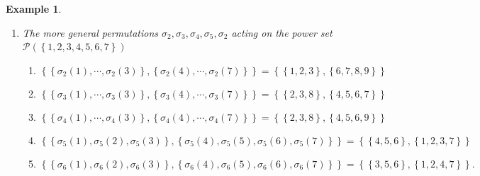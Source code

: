 \documentclass[aps,preprint]{revtex4}%
\newtheorem{example}[theorem]{Example}
\begin{document}
\begin{example}
\begin{enumerate}
\item The more general permutations $\sigma_{2},\sigma_{3},\sigma_{4}%
,\sigma_{5},\sigma_{2}$ acting on the power set $\mathcal{P}\left(  \left\{
1,2,3,4,5,6,7\right\}  \right)  $

\begin{enumerate}
\item
\begin{equation}
\left\{  \left\{  \sigma_{2}\left(  1\right)  ,\cdots,\sigma_{2}\left(
3\right)  \right\}  ,\left\{  \sigma_{2}\left(  4\right)  ,\cdots,\sigma
_{2}\left(  7\right)  \right\}  \right\}  =\left\{  \left\{  1,2,3\right\}
,\left\{  6,7,8,9\right\}  \right\}
\end{equation}


\item
\begin{equation}
\left\{  \left\{  \sigma_{3}\left(  1\right)  ,\cdots,\sigma_{3}\left(
3\right)  \right\}  ,\left\{  \sigma_{3}\left(  4\right)  ,\cdots,\sigma
_{3}\left(  7\right)  \right\}  \right\}  =\left\{  \left\{  2,3,8\right\}
,\left\{  4,5,6,7\right\}  \right\}
\end{equation}


\item
\begin{equation}
\left\{  \left\{  \sigma_{4}\left(  1\right)  ,\cdots,\sigma_{4}\left(
3\right)  \right\}  ,\left\{  \sigma_{4}\left(  4\right)  ,\cdots,\sigma
_{4}\left(  7\right)  \right\}  \right\}  =\left\{  \left\{  2,3,8\right\}
,\left\{  4,5,6,9\right\}  \right\}
\end{equation}


\item
\begin{equation}
\left\{  \left\{  \sigma_{5}\left(  1\right)  ,\sigma_{5}\left(  2\right)
,\sigma_{5}\left(  3\right)  \right\}  ,\left\{  \sigma_{5}\left(  4\right)
,\sigma_{5}\left(  5\right)  ,\sigma_{5}\left(  6\right)  ,\sigma_{5}\left(
7\right)  \right\}  \right\}  =\left\{  \left\{  4,5,6\right\}  ,\left\{
1,2,3,7\right\}  \right\}
\end{equation}


\item
\begin{equation}
\left\{  \left\{  \sigma_{6}\left(  1\right)  ,\sigma_{6}\left(  2\right)
,\sigma_{6}\left(  3\right)  \right\}  ,\left\{  \sigma_{6}\left(  4\right)
,\sigma_{6}\left(  5\right)  ,\sigma_{6}\left(  6\right)  ,\sigma_{6}\left(
7\right)  \right\}  \right\}  =\left\{  \left\{  3,5,6\right\}  ,\left\{
1,2,4,7\right\}  \right\}  .
\end{equation}

\end{enumerate}
\end{enumerate}
\end{example}
\end{document}
